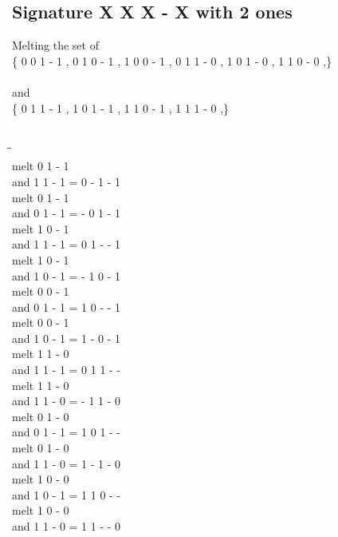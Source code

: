 \documentclass{article}
\begin{document}
\subsection{Signature X X X - X with 2 ones}
Melting the set of\\
\{ 0  0  1  -  1 , 0  1  0  -  1 , 1  0  0  -  1 , 0  1  1  -  0 , 1  0  1  -  0 , 1  1  0  -  0 ,\}\\\\
and\\
\{ 0  1  1  -  1 , 1  0  1  -  1 , 1  1  0  -  1 , 1  1  1  -  0 ,\}\\\\
\begin{tabbing}
\hspace{3cm}\=\hspace{3cm}\=\hspace{3cm}\\[1cm]
melt  0  1  -  1 \\
and  1  1  -  1 \>
 =  0  -  1  -  1 \\[1mm]
melt  0  1  -  1 \\
and  0  1  -  1 \>
 =  -  0  1  -  1 \\[1mm]
melt  1  0  -  1 \\
and  1  1  -  1 \>
 =  0  1  -  -  1 \\[1mm]
melt  1  0  -  1 \\
and  1  0  -  1 \>
 =  -  1  0  -  1 \\[1mm]
melt  0  0  -  1 \\
and  0  1  -  1 \>
 =  1  0  -  -  1 \\[1mm]
melt  0  0  -  1 \\
and  1  0  -  1 \>
 =  1  -  0  -  1 \\[1mm]
melt  1  1  -  0 \\
and  1  1  -  1 \>
 =  0  1  1  -  - \\[1mm]
melt  1  1  -  0 \\
and  1  1  -  0 \>
 =  -  1  1  -  0 \\[1mm]
melt  0  1  -  0 \\
and  0  1  -  1 \>
 =  1  0  1  -  - \\[1mm]
melt  0  1  -  0 \\
and  1  1  -  0 \>
 =  1  -  1  -  0 \\[1mm]
melt  1  0  -  0 \\
and  1  0  -  1 \>
 =  1  1  0  -  - \\[1mm]
melt  1  0  -  0 \\
and  1  1  -  0 \>
 =  1  1  -  -  0 \\[1mm]
\end{tabbing}
\newpage
\end{document}
